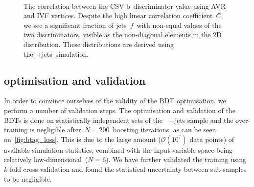 \begin{figure}
\begin{centering}
 \\
\caption[The correlation between the CSV b~discriminator value using AVR and IVF vertices]{The correlation between the CSV b~discriminator value using AVR and IVF vertices. Despite the high linear correlation coefficient~$C$, we see a significant fraction of jets~$f$~with non-equal values of the two discriminators, visible as the non-diagonal elements in the 2D distribution. These distributions are derived using the~\ttbar+jets~simulation.}
\label{fig:btag_csv_correlation}
\end{centering}
\end{figure}

\subsection{optimisation and validation}
In order to convince ourselves of the validity of the BDT optimisation, we perform a number of validation steps. The optimisation and validation of the BDTs is done on statistically independent sets of the~\ttbar~+jets sample and the over-training is negligible after~$N=200$~boosting iterations, as can be seen on~\cref{fig:btag_loss}. This is due to the large amount ($\mathcal{O}(10^7)$ data points) of available simulation statistics, combined with the input variable space being relatively low-dimensional~($N=6$). We have further validated the training using $k$-fold cross-validation and found the statistical uncertainty between sub-samples to be negligible.

